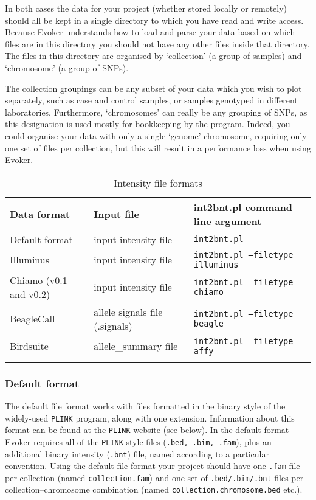 \documentclass{article}
\begin{document}
In both cases the data for your project (whether stored locally or remotely) should all be kept in a single directory to which you have read and write access. Because Evoker understands how to load and parse your data based on which files are in this directory you should not have any other files inside that directory. The files in this directory are organised by `collection' (a group of samples) and `chromosome' (a group of SNPs).

The collection groupings can be any subset of your data which you wish to plot separately, such as case and control samples, or samples genotyped in different laboratories. Furthermore, `chromosomes' can really be any grouping of SNPs, as this designation is used mostly for bookkeeping by the program. Indeed, you could organise your data with only a single `genome' chromosome, requiring only one set of files per collection, but this will result in a performance loss when using Evoker.

\begin{table}
  \begin{center}
    \caption[Intensity file formats]{Intensity file formats}
    \vspace{0.2cm}
    \label{FileFormats}
    \begin{tabular}[p]{ l l l}
     \toprule[1.5pt]
      Data format & Input file & int2bnt.pl command line argument \\
      \midrule
		Default format & input intensity file & \texttt{int2bnt.pl}\\
		Illuminus & input intensity file & \texttt{int2bnt.pl --filetype illuminus}\\
		Chiamo (v0.1 and v0.2) & input intensity file & \texttt{int2bnt.pl --filetype chiamo}\\
		BeagleCall & allele signals file (.signals) & \texttt{int2bnt.pl --filetype beagle}\\
		Birdsuite & allele\_summary file & \texttt{int2bnt.pl --filetype affy}\\
      \addlinespace      
      \bottomrule[0.5pt]
    \end{tabular}
  \end{center}
\end{table}


\subsubsection{Default format}
The default file format works with files formatted in the binary style of the widely-used \texttt{PLINK} program, along with one extension. Information about this format can be found at the \texttt{PLINK} website (see below). In the default format Evoker requires all of the \texttt{PLINK} style files (\texttt{.bed, .bim, .fam}), plus an additional binary intensity (\texttt{.bnt}) file, named according to a particular convention. Using the default file format your project should have one \texttt{.fam} file per collection (named \texttt{collection.fam}) and one set of \texttt{.bed/.bim/.bnt} files per collection--chromosome combination (named \texttt{collection.chromosome.bed} etc.).
\end{document}
